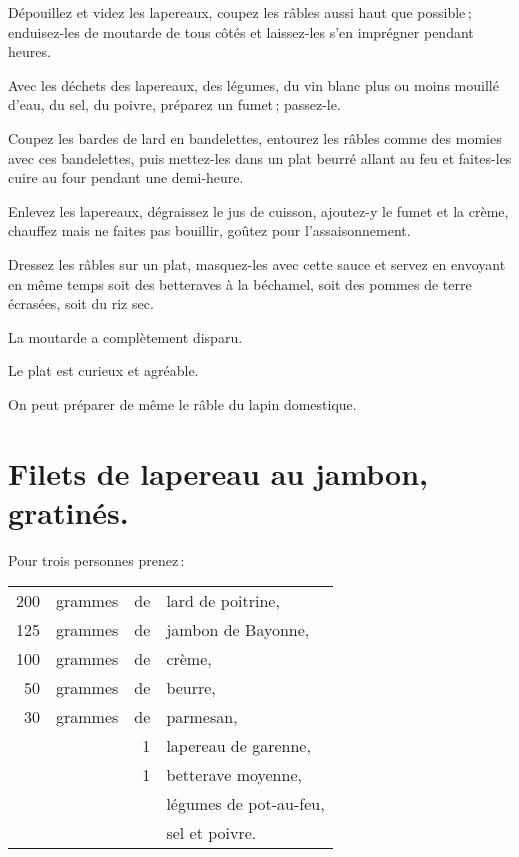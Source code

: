 Dépouillez et videz les lapereaux, coupez les râbles aussi haut que possible ;
enduisez-les de moutarde de tous côtés et laissez-les s'en imprégner pendant
{\mmm} heures.

Avec les déchets des lapereaux, des légumes, du vin blanc plus ou moins mouillé
d'eau, du sel, du poivre, préparez un fumet ; passez-le.

Coupez les bardes de lard en bandelettes, entourez les râbles comme des momies
avec ces bandelettes, puis mettez-les dans un plat beurré allant au feu et
faites-les cuire au four pendant une demi-heure.

Enlevez les lapereaux, dégraissez le jus de cuisson, ajoutez-y le fumet et la
crème, chauffez mais ne faites pas bouillir, goûtez pour l'assaisonnement.

Dressez les râbles sur un plat, masquez-les avec cette sauce et servez en
envoyant en même temps soit des betteraves à la béchamel, soit des pommes de
terre écrasées, soit du riz sec.

La moutarde a complètement disparu.

Le plat est curieux et agréable.

\sk

On peut préparer de même le râble du lapin domestique.

\section*{\centering Filets de lapereau au jambon, gratinés.}
{}

Pour trois personnes prenez :

\footnotesize
\begin{longtable}{rrrp{16em}}
    200 & grammes & de & lard de poitrine,                                                                \\
    125 & grammes & de & jambon de Bayonne,                                                               \\
    100 & grammes & de & crème,                                                                           \\
     50 & grammes & de & beurre,                                                                          \\
     30 & grammes & de & parmesan,                                                                        \\
        &         &  1 & lapereau de garenne,                                                             \\
        &         &  1 & betterave moyenne,                                                               \\
        &         &    & légumes de pot-au-feu,                                                           \\
        &         &    & sel et poivre.                                                                   \\
\end{longtable}
\normalsize

